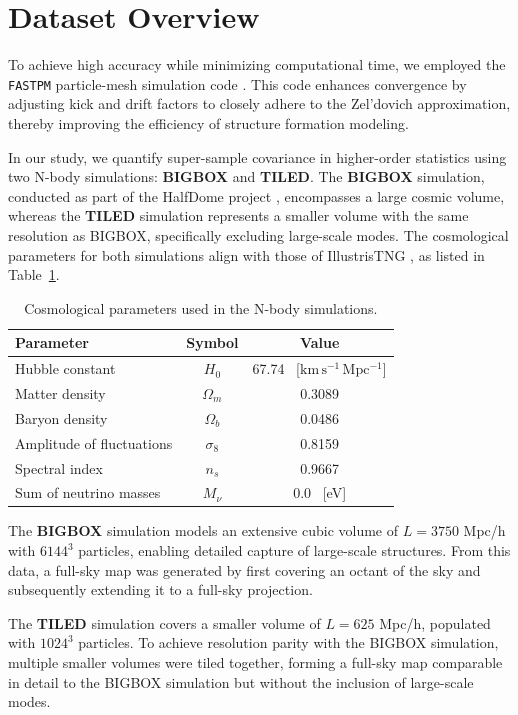 \section{Dataset Overview}
To achieve high accuracy while minimizing computational time, we employed the \texttt{FASTPM} particle-mesh simulation code \citep{10.1093/mnras/stw2123}. This code enhances convergence by adjusting kick and drift factors to closely adhere to the Zel'dovich approximation, thereby improving the efficiency of structure formation modeling.

In our study, we quantify super-sample covariance in higher-order statistics using two N-body simulations: \textbf{BIGBOX} and \textbf{TILED}. The \textbf{BIGBOX} simulation, conducted as part of the HalfDome project \citep{2024arXiv240717462B}, encompasses a large cosmic volume, whereas the \textbf{TILED} simulation represents a smaller volume with the same resolution as BIGBOX, specifically excluding large-scale modes. The cosmological parameters for both simulations align with those of IllustrisTNG \citep{2019ComAC...6....2N}, as listed in Table~\ref{tab:simulations}.

\begin{table}[h]
\centering
\begin{tabular}{lcc}
\toprule
\textbf{Parameter} & \textbf{Symbol} & \textbf{Value} \\
\midrule
Hubble constant & $H_0$ & 67.74 \, [$\mathrm{km\,s^{-1}\,Mpc^{-1}}$] \\ 
Matter density & $\Omega_m$ & 0.3089 \\
Baryon density & $\Omega_b$ & 0.0486 \\
Amplitude of fluctuations & $\sigma_8$ & 0.8159 \\
Spectral index & $n_s$ & 0.9667 \\
Sum of neutrino masses & $M_{\nu}$ & 0.0 \, [eV] \\
\bottomrule
\end{tabular}
\caption{Cosmological parameters used in the N-body simulations.}\label{tab:simulations}
\end{table}

The \textbf{BIGBOX} simulation models an extensive cubic volume of $L = 3750$ Mpc/h with $6144^3$ particles, enabling detailed capture of large-scale structures. From this data, a full-sky map was generated by first covering an octant of the sky and subsequently extending it to a full-sky projection.

The \textbf{TILED} simulation covers a smaller volume of $L = 625$ Mpc/h, populated with $1024^3$ particles. To achieve resolution parity with the BIGBOX simulation, multiple smaller volumes were tiled together, forming a full-sky map comparable in detail to the BIGBOX simulation but without the inclusion of large-scale modes.

